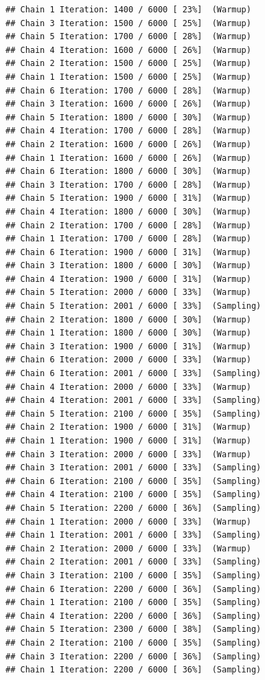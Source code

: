 \documentclass[
]{article}
\begin{document}
\begin{verbatim}
## Chain 1 Iteration: 1400 / 6000 [ 23%]  (Warmup) 
## Chain 3 Iteration: 1500 / 6000 [ 25%]  (Warmup) 
## Chain 5 Iteration: 1700 / 6000 [ 28%]  (Warmup) 
## Chain 4 Iteration: 1600 / 6000 [ 26%]  (Warmup) 
## Chain 2 Iteration: 1500 / 6000 [ 25%]  (Warmup) 
## Chain 1 Iteration: 1500 / 6000 [ 25%]  (Warmup) 
## Chain 6 Iteration: 1700 / 6000 [ 28%]  (Warmup) 
## Chain 3 Iteration: 1600 / 6000 [ 26%]  (Warmup) 
## Chain 5 Iteration: 1800 / 6000 [ 30%]  (Warmup) 
## Chain 4 Iteration: 1700 / 6000 [ 28%]  (Warmup) 
## Chain 2 Iteration: 1600 / 6000 [ 26%]  (Warmup) 
## Chain 1 Iteration: 1600 / 6000 [ 26%]  (Warmup) 
## Chain 6 Iteration: 1800 / 6000 [ 30%]  (Warmup) 
## Chain 3 Iteration: 1700 / 6000 [ 28%]  (Warmup) 
## Chain 5 Iteration: 1900 / 6000 [ 31%]  (Warmup) 
## Chain 4 Iteration: 1800 / 6000 [ 30%]  (Warmup) 
## Chain 2 Iteration: 1700 / 6000 [ 28%]  (Warmup) 
## Chain 1 Iteration: 1700 / 6000 [ 28%]  (Warmup) 
## Chain 6 Iteration: 1900 / 6000 [ 31%]  (Warmup) 
## Chain 3 Iteration: 1800 / 6000 [ 30%]  (Warmup) 
## Chain 4 Iteration: 1900 / 6000 [ 31%]  (Warmup) 
## Chain 5 Iteration: 2000 / 6000 [ 33%]  (Warmup) 
## Chain 5 Iteration: 2001 / 6000 [ 33%]  (Sampling) 
## Chain 2 Iteration: 1800 / 6000 [ 30%]  (Warmup) 
## Chain 1 Iteration: 1800 / 6000 [ 30%]  (Warmup) 
## Chain 3 Iteration: 1900 / 6000 [ 31%]  (Warmup) 
## Chain 6 Iteration: 2000 / 6000 [ 33%]  (Warmup) 
## Chain 6 Iteration: 2001 / 6000 [ 33%]  (Sampling) 
## Chain 4 Iteration: 2000 / 6000 [ 33%]  (Warmup) 
## Chain 4 Iteration: 2001 / 6000 [ 33%]  (Sampling) 
## Chain 5 Iteration: 2100 / 6000 [ 35%]  (Sampling) 
## Chain 2 Iteration: 1900 / 6000 [ 31%]  (Warmup) 
## Chain 1 Iteration: 1900 / 6000 [ 31%]  (Warmup) 
## Chain 3 Iteration: 2000 / 6000 [ 33%]  (Warmup) 
## Chain 3 Iteration: 2001 / 6000 [ 33%]  (Sampling) 
## Chain 6 Iteration: 2100 / 6000 [ 35%]  (Sampling) 
## Chain 4 Iteration: 2100 / 6000 [ 35%]  (Sampling) 
## Chain 5 Iteration: 2200 / 6000 [ 36%]  (Sampling) 
## Chain 1 Iteration: 2000 / 6000 [ 33%]  (Warmup) 
## Chain 1 Iteration: 2001 / 6000 [ 33%]  (Sampling) 
## Chain 2 Iteration: 2000 / 6000 [ 33%]  (Warmup) 
## Chain 2 Iteration: 2001 / 6000 [ 33%]  (Sampling) 
## Chain 3 Iteration: 2100 / 6000 [ 35%]  (Sampling) 
## Chain 6 Iteration: 2200 / 6000 [ 36%]  (Sampling) 
## Chain 1 Iteration: 2100 / 6000 [ 35%]  (Sampling) 
## Chain 4 Iteration: 2200 / 6000 [ 36%]  (Sampling) 
## Chain 5 Iteration: 2300 / 6000 [ 38%]  (Sampling) 
## Chain 2 Iteration: 2100 / 6000 [ 35%]  (Sampling) 
## Chain 3 Iteration: 2200 / 6000 [ 36%]  (Sampling) 
## Chain 1 Iteration: 2200 / 6000 [ 36%]  (Sampling) 

\end{verbatim}
\end{document}
